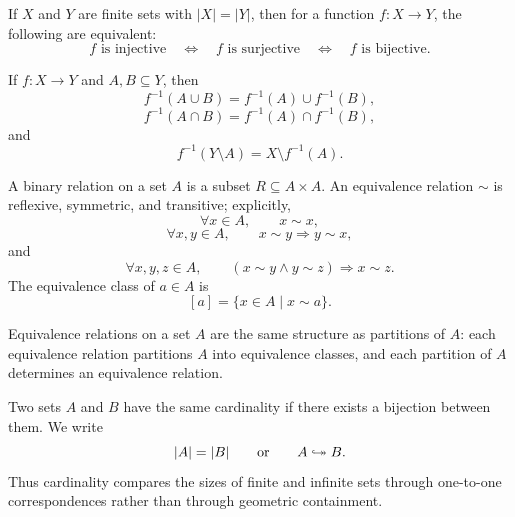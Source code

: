     \begin{proposition}
        If $X$ and $Y$ are finite sets with $|X|=|Y|$, then for a function
        $f\colon X\to Y$, the following are equivalent:
        \[
            f\text{ is injective}
            \quad\Longleftrightarrow\quad
            f\text{ is surjective}
            \quad\Longleftrightarrow\quad
            f\text{ is bijective}.
        \]
    \end{proposition}

    \begin{proposition}
        If $f\colon X\to Y$ and $A,B\subseteq Y$, then
        \[
            f^{-1}(A\cup B)=f^{-1}(A)\cup f^{-1}(B),
        \]
        \[
            f^{-1}(A\cap B)=f^{-1}(A)\cap f^{-1}(B),
        \]
        and
        \[
            f^{-1}(Y\setminus A)=X\setminus f^{-1}(A).
        \]
    \end{proposition}

    \begin{definition}
        A binary relation on a set $A$ is a subset $R\subseteq A\times A$.
        An equivalence relation $\sim$ is reflexive, symmetric, and transitive;
        explicitly,
        \[
            \forall x\in A,
            \qquad x\sim x,
        \]
        \[
            \forall x,y\in A,
            \qquad x\sim y\Rightarrow y\sim x,
        \]
        and
        \[
            \forall x,y,z\in A,
            \qquad
            (x\sim y\land y\sim z)\Rightarrow x\sim z.
        \]
        The equivalence class of $a\in A$ is
        \[
            [a]=\{x\in A\mid x\sim a\}.
        \]
    \end{definition}

    \begin{proposition}
        Equivalence relations on a set $A$ are the same structure as partitions
        of $A$: each equivalence relation partitions $A$ into equivalence
        classes, and each partition of $A$ determines an equivalence relation.
    \end{proposition}

    \begin{definition}
        Two sets $A$ and $B$ have the same cardinality if there exists a
        bijection between them. We write
        \[
            |A|=|B|
            \qquad\text{or}\qquad
            A\bijarrow B.
        \]
        Thus cardinality compares the sizes of finite and infinite sets through
        one-to-one correspondences rather than through geometric containment.
    \end{definition}

